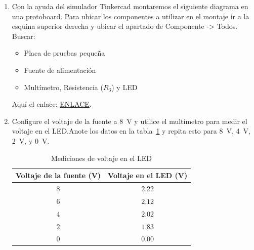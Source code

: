\documentclass{article}
\begin{document}
    
    \begin{enumerate}
        \subsection{TinkerCad}
        
        \item Con la ayuda del simulador Tinkercad montaremos el siguiente diagrama en una protoboard. Para ubicar los componentes a utilizar en el montaje ir a la esquina superior derecha y ubicar el apartado de Componente -> Todos. Buscar:
        
        \begin{itemize}
            \item Placa de pruebas pequeña
            \item Fuente de alimentación
            \item Multímetro, Resistencia ($R_3$) y LED
        \end{itemize}
        
        
        Aquí el enlace: \href{https://www.tinkercad.com/things/chY8fM75SH5-practica41?sharecode=90YL5oCHnwQ_MQJhmHVnnGpzegIlfVVufIDYtoEFfxI}{ENLACE}.

        \item Configure el voltaje de la fuente a \SI{8}{\volt} y utilice el multímetro para medir el voltaje en el LED.\@ Anote los datos en la tabla~\ref{tab:3} y repita esto para \SI{8}{\volt}, \SI{4}{\volt}, \SI{2}{\volt}, y \SI{0}{\volt}.
        
        \begin{table}[ht]
            \centering
            \begin{tabular}{|c|c|} %
                \midrule 
                Voltaje de la fuente (\unit{\volt}) & Voltaje en el LED (\unit{\volt})  \\
                \midrule
                $8$                                 & $2.22$                            \\
                $6$                                 & $2.12$                            \\
                $4$                                 & $2.02$                            \\
                $2$                                 & $1.83$                            \\
                $0$                                 & $0.00$                            \\
                \midrule
            \end{tabular}
            \caption{Mediciones de voltaje en el LED}\label{tab:3}
        \end{table}


\end{enumerate}
\end{document}
